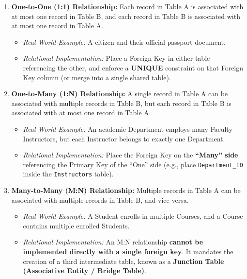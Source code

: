 \begin{enumerate}
\item \textbf{One-to-One (1:1) Relationship:}
Each record in Table A is associated with at most one record in Table B, and each record in Table B is associated with at most one record in Table A.
\begin{itemize}
\item \textit{Real-World Example:} A citizen and their official passport document.
\item \textit{Relational Implementation:} Place a Foreign Key in either table referencing the other, and enforce a \textbf{UNIQUE} constraint on that Foreign Key column (or merge into a single shared table).
\end{itemize}

\item \textbf{One-to-Many (1:N) Relationship:}
A single record in Table A can be associated with multiple records in Table B, but each record in Table B is associated with at most one record in Table A.
\begin{itemize}
\item \textit{Real-World Example:} An academic Department employs many Faculty Instructors, but each Instructor belongs to exactly one Department.
\item \textit{Relational Implementation:} Place the Foreign Key on the \textbf{``Many'' side} referencing the Primary Key of the ``One'' side (e.g., place \texttt{Department\_ID} inside the \texttt{Instructors} table).
\end{itemize}

\item \textbf{Many-to-Many (M:N) Relationship:}
Multiple records in Table A can be associated with multiple records in Table B, and vice versa.
\begin{itemize}
\item \textit{Real-World Example:} A Student enrolls in multiple Courses, and a Course contains multiple enrolled Students.
\item \textit{Relational Implementation:} An M:N relationship \textbf{cannot be implemented directly with a single foreign key}. It mandates the creation of a third intermediate table, known as a \textbf{Junction Table (Associative Entity / Bridge Table)}.
\end{itemize}
\end{enumerate}

